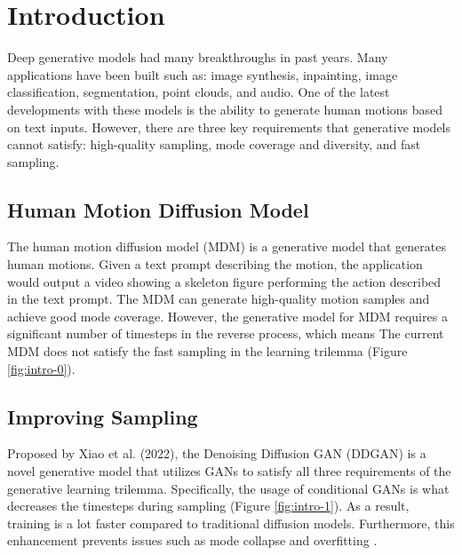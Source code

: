 \documentclass[10pt,twocolumn,letterpaper]{article}
\begin{document}
\section{Introduction}
\label{sec:intro}

Deep generative models had many breakthroughs in past years. Many applications have been built such as: 
image synthesis, inpainting, image classification, segmentation, point clouds, and audio. One of the latest developments with 
these models is the ability to generate human motions based on text inputs. However, there are three key requirements 
that generative models cannot satisfy: high-quality sampling, mode coverage and diversity, and fast sampling. 

\subsection{Human Motion Diffusion Model}

The human motion diffusion model (MDM) is a generative model that generates human motions. Given a text prompt describing the motion, the application would output a video showing a skeleton figure performing the action described in the text prompt. 
The MDM can generate high-quality motion samples and achieve good mode coverage. 
However, the generative model for MDM requires a significant number of timesteps in the reverse process, which means 
The current MDM does not satisfy the fast sampling in the learning trilemma 
 (Figure \ref{fig:intro-0}). 

\subsection{Improving Sampling}

Proposed by Xiao et al. (2022), the Denoising Diffusion GAN (DDGAN) is a novel generative model that utilizes 
GANs to satisfy all three requirements of the generative learning trilemma. Specifically, the usage of 
conditional GANs is what decreases the timesteps during sampling (Figure \ref{fig:intro-1}). As a result, training is a lot faster 
compared to traditional diffusion models. Furthermore, this enhancement prevents issues such as mode collapse and 
overfitting \cite{Xiao22}.
\end{document}
